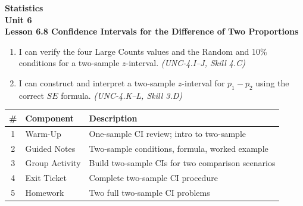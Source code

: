 \documentclass[10pt]{article}
\begin{document}
\vspace{-0.8in}

\begin{center}
  {\color{white}\textbf{\LARGE Statistics}}\\[4pt]
  {\color{skymid}\large\textbf{Unit 6}}\\[6pt]
  {\color{white}\textbf{\large Lesson 6.8 \quad Confidence Intervals for the Difference of Two Proportions}}
\end{center}

\vspace{0.22in}
\namedateperiod
\vspace{0.18in}

\begin{learningtargetbox}
\small
\begin{enumerate}[leftmargin=1.5em, itemsep=5pt]
  \item I can verify the four Large Counts values and the Random and 10\% conditions for a two-sample $z$-interval. \textit{(UNC-4.I--J, Skill 4.C)}
  \item I can construct and interpret a two-sample $z$-interval for $p_1 - p_2$ using the correct $SE$ formula. \textit{(UNC-4.K--L, Skill 3.D)}
\end{enumerate}
\end{learningtargetbox}

\vspace{0.14in}

\begin{tocbox}
\small
\renewcommand{\arraystretch}{1.5}
\begin{tabularx}{\linewidth}{@{} c l X @{}}
\rowcolor{sky}
\textbf{\#} & \textbf{Component} & \textbf{Description} \\
\midrule
1 & Warm-Up        & One-sample CI review; intro to two-sample \\
2 & Guided Notes   & Two-sample conditions, formula, worked example \\
3 & Group Activity & Build two-sample CIs for two comparison scenarios \\
4 & Exit Ticket    & Complete two-sample CI procedure \\
5 & Homework       & Two full two-sample CI problems \\
\end{tabularx}
\end{tocbox}
\end{document}
